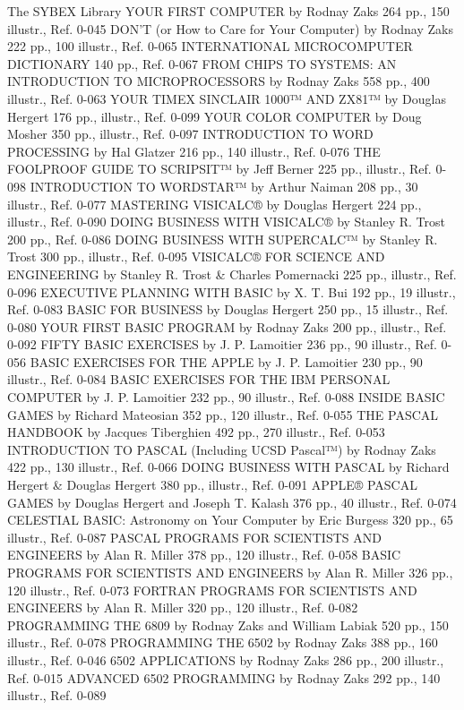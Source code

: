 \documentclass{book}
\begin{document}
{{{{{{{{{{{{{{{{{{{{{{{{{{{{{{{{{{{{{{{{{{{{{{{{{{{{{{{{{{{{{{{{{{{{{{{{{{{{{{{{{{{{{{{{{{{{{{{{{{{{{{{{{{{{{{{{{{{{{{{{{{{{{{{{{{{{{{{{{{{{The SYBEX Library
YOUR FIRST COMPUTER
by Rodnay Zaks 264 pp., 150 illustr., Ref. 0-045
DON'T (or How to Care for Your Computer)
by Rodnay Zaks 222 pp., 100 illustr., Ref. 0-065
INTERNATIONAL MICROCOMPUTER DICTIONARY
140 pp., Ref. 0-067
FROM CHIPS TO SYSTEMS:
AN INTRODUCTION TO MICROPROCESSORS
by Rodnay Zaks 558 pp., 400 illustr., Ref. 0-063
YOUR TIMEX SINCLAIR 1000™ AND ZX81™
by Douglas Hergert 176 pp., illustr., Ref. 0-099
YOUR COLOR COMPUTER
by Doug Mosher 350 pp., illustr., Ref. 0-097
INTRODUCTION TO WORD PROCESSING
by Hal Glatzer 216 pp., 140 illustr., Ref. 0-076
THE FOOLPROOF GUIDE TO SCRIPSIT™
by Jeff Berner 225 pp., illustr., Ref. 0-098
INTRODUCTION TO WORDSTAR™
by Arthur Naiman 208 pp., 30 illustr., Ref. 0-077
MASTERING VISICALC®
by Douglas Hergert 224 pp., illustr., Ref. 0-090
DOING BUSINESS WITH VISICALC®
by Stanley R. Trost 200 pp., Ref. 0-086
DOING BUSINESS WITH SUPERCALC™
by Stanley R. Trost 300 pp., illustr., Ref. 0-095
VISICALC® FOR SCIENCE AND ENGINEERING
by Stanley R. Trost & Charles Pomernacki 225 pp., illustr., Ref. 0-096
EXECUTIVE PLANNING WITH BASIC
by X. T. Bui 192 pp., 19 illustr., Ref. 0-083
BASIC FOR BUSINESS
by Douglas Hergert 250 pp., 15 illustr., Ref. 0-080
YOUR FIRST BASIC PROGRAM
by Rodnay Zaks 200 pp., illustr., Ref. 0-092
FIFTY BASIC EXERCISES
by J. P. Lamoitier 236 pp., 90 illustr., Ref. 0-056
BASIC EXERCISES FOR THE APPLE
by J. P. Lamoitier 230 pp., 90 illustr., Ref. 0-084
BASIC EXERCISES FOR THE IBM PERSONAL COMPUTER
by J. P. Lamoitier 232 pp., 90 illustr., Ref. 0-088
INSIDE BASIC GAMES
by Richard Mateosian 352 pp., 120 illustr., Ref. 0-055
THE PASCAL HANDBOOK
by Jacques Tiberghien 492 pp., 270 illustr., Ref. 0-053
INTRODUCTION TO PASCAL (Including UCSD Pascal™)
by Rodnay Zaks 422 pp., 130 illustr., Ref. 0-066
DOING BUSINESS WITH PASCAL
by Richard Hergert & Douglas Hergert 380 pp., illustr., Ref. 0-091
APPLE® PASCAL GAMES
by Douglas Hergert and Joseph T. Kalash 376 pp., 40 illustr., Ref. 0-074
CELESTIAL BASIC: Astronomy on Your Computer
by Eric Burgess 320 pp., 65 illustr., Ref. 0-087
PASCAL PROGRAMS FOR SCIENTISTS AND ENGINEERS
by Alan R. Miller 378 pp., 120 illustr., Ref. 0-058
BASIC PROGRAMS FOR SCIENTISTS AND ENGINEERS
by Alan R. Miller 326 pp., 120 illustr., Ref. 0-073
FORTRAN PROGRAMS FOR SCIENTISTS AND ENGINEERS
by Alan R. Miller 320 pp., 120 illustr., Ref. 0-082
PROGRAMMING THE 6809
by Rodnay Zaks and William Labiak 520 pp., 150 illustr., Ref. 0-078
PROGRAMMING THE 6502
by Rodnay Zaks 388 pp., 160 illustr., Ref. 0-046
6502 APPLICATIONS
by Rodnay Zaks 286 pp., 200 illustr., Ref. 0-015
ADVANCED 6502 PROGRAMMING
by Rodnay Zaks 292 pp., 140 illustr., Ref. 0-089
}}}}}}}}}}}}}}}}}}}}}}}}}}}}}}}}}}}}}}}}}}}}}}}}}}}}}}}}}}}}}}}}}}}}}}}}}}}}}}}}}}}}}}}}}}}}}}}}}}}}}}}}}}}}}}}}}}}}}}}}}}}}}}}}}}}}}}}}}}}}
\end{document}
